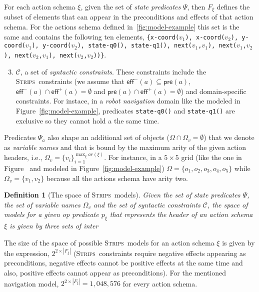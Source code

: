 \documentclass[letterpaper]{article} %
\newcommand{\pre}{\mathsf{pre}}     %
\newcommand{\eff}{\mathsf{eff}}     %
\newcommand{\strips}{\textsc{Strips}}     %
\newtheorem{definition}[theorem]{Definition}
\begin{document}
For each action schema $\xi$, given the set of {\em state predicates} $\Psi$, then $F_{\xi}$ defines the subset of elements that can appear in the preconditions and effects of that action schema. For the actions schema defined in~\ref{fig:model-example} this set is the same and contains the following ten elements, {\small\tt\{x-coord($v_1$), x-coord($v_2$), y-coord($v_1$), y-coord($v_2$), state-q0(), state-q1(), next($v_1$,$v_1$), next($v_1$,$v_2$), next($v_2$,$v_1$), next($v_2$,$v_2$))\}}.

\begin{enumerate}
\setcounter{enumi}{2}
\item ${\mathcal C}$, a set of {\em syntactic constraints}. These constraints include the \strips\ constraints (we assume that $\eff^-(a)\subseteq \pre(a)$, $\eff^-(a)\cap \eff^+(a)=\emptyset$ and $\pre(a)\cap \eff^+(a)=\emptyset$) and domain-specific constraints. For instace, in a {\em robot navigation} domain like the modeled in Figure~\ref{fig:model-example}, predicates {\small\tt state-q0()} and {\small\tt state-q1()} are exclusive so they cannot hold a the same time.
\end{enumerate}

Predicates $\Psi_a$ also shape an additional set of objects ($\Omega\cap\Omega_v=\emptyset$) that we denote as {\em variable names} and that is bound by the maximum arity of the given action headers, i.e., $\Omega_v=\{v_i\}_{i=1}^{\operatorname*{max}_{\xi} ar(\xi)}$. For instance, in a $5\times 5$ grid (like the one in Figure~\label{fig:grid-example} and modeled in Figure~\ref{fig:model-example}) $\Omega=\{o_1, o_2, o_3, o_4, o_5\}$ while $\Omega_v=\{v_1, v_2\}$ because all the actions schema have arity two.

\begin{definition}[The space of \strips\ models]
Given the set of {\em state predicates} $\Psi$, the set of {\em variable names} $\Omega_v$ and the set of {\em syntactic constraints} ${\mathcal C}$, the space of models for a given op predicate $p_\xi$ that represents the header of an action schema $\xi$ is given by three sets of inter
\end{definition}

The size of the space of possible \strips\ models for an action schema $\xi$ is given by the expression, $2^{2\times|F_{\xi}|}$ (\strips\ constraints require negative effects appearing as preconditions, negative effects cannot be positive effects at the same time and also, positive effects cannot appear as preconditions). For the mentioned navigation model, $2^{2\times|F_{\xi}|}=1,048,576$ for every action schema.
\end{document}
